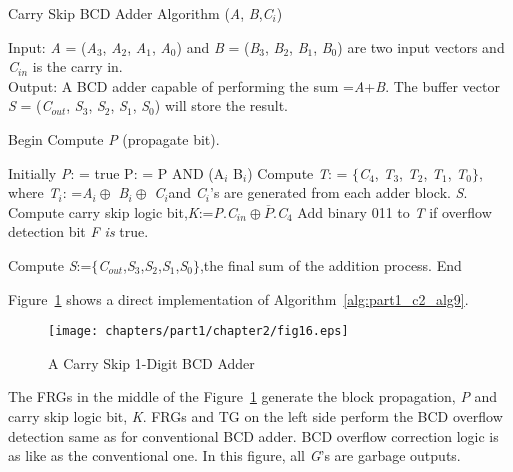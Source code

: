 \begin{algorithm}[!tbh]
	\caption{Carry Skip BCD Adder Algorithm ({\it A}, {\it B},{\it C${}_{i}$})}
	\label{alg:part1_c2_alg9}
	Input: {\it A }= ({\it A}${}_{3}$, {\it A}${}_{2}$, {\it A}${}_{1}$, {\it A}${}_{0}$) and {\it B }= ({\it B}${}_{3}$, {\it B}${}_{2}$, {\it B}${}_{1}$, {\it B}${}_{0}$) are two input vectors and {\it C}${}_{in}$ is the carry in.\\
	Output: A BCD adder capable of performing the sum ={\it A}+{\it B}. The buffer vector {\it S }= ({\it C}${}_{out}$, {\it S}${}_{3}$, {\it S}${}_{2}$, {\it S}${}_{1}$, {\it S}${}_{0}$) will store the result.
	\begin{algorithmic}[1]
		\STATE Begin
		\STATE Compute {\it P }(propagate bit).
		
		\STATE Initially {\it P}: = true
		\STATE P: = P AND (A${}_{i}$ B${}_{i}$)
		\ENDFOR
		\STATE Compute   {\it T}: = ${\{}${\it C}${}_{4}$,   {\it T}${}_{3}$,   {\it T}${}_{2}$,   {\it T}${}_{1}$,   {\it T}${}_{0}$${\}}$,   where   {\it T${}_{i}$}: ={\it A${}_{i}\oplus$} {\it B${}_{i}\oplus$} {\it C${}_{i}$}and {\it C${}_{i}$}'s are generated from each adder block.
		 {\it S}.
		\STATE Compute carry skip logic bit,{\it K}:={\it P}.{\it C}${}_{in}\oplus \overline{P}$.{\it C}${}_{4}$
		\STATE Add binary 011 to {\it T }if overflow detection bit {\it F is} true.
		
		\STATE Compute {\it S}:=${\{}${\it C}${}_{out}$,{\it S}${}_{3}$,{\it S}${}_{2}$,{\it S}${}_{1}$,{\it S}${}_{0}$${\}}$,the final sum of the addition process.
		\STATE End
	\end{algorithmic}
\end{algorithm}

\begin{example}\textnormal{
		Figure~\ref{fig:p1_c2_fig16} shows a direct implementation of Algorithm~\ref{alg:part1_c2_alg9}.}
\end{example}

\begin{figure}[!tbh]
	\centering
	\texttt{[image: chapters/part1/chapter2/fig16.eps]}
	\caption{A Carry Skip 1-Digit BCD Adder}
	\label{fig:p1_c2_fig16}
\end{figure}

The FRGs in the middle of the Figure~\ref{fig:p1_c2_fig16} generate the block propagation, {\it P }and carry skip logic bit, {\it K}. FRGs and TG on the left side perform the BCD overflow detection same as for conventional BCD adder. BCD overflow correction logic is as like as the conventional one. In this figure, all {\it G}'s are garbage outputs.

